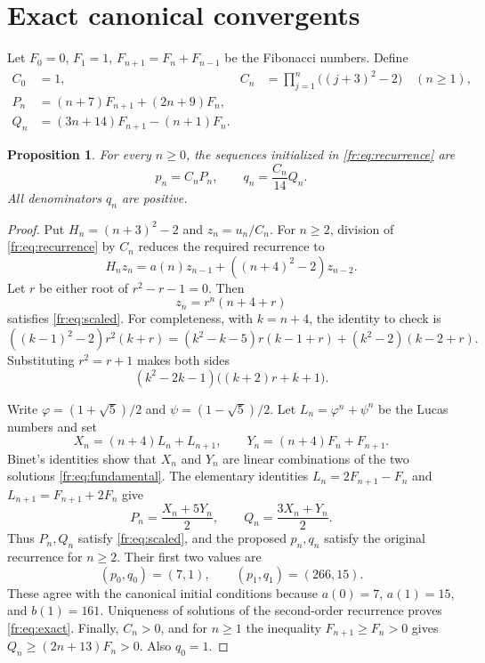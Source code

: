 \documentclass[11pt,a4paper]{article}
\newtheorem{proposition}[theorem]{Proposition}
\theoremstyle{definition}
\theoremstyle{remark}
\numberwithin{equation}{section}
\begin{document}
\section{Exact canonical convergents}

Let $F_0=0$, $F_1=1$, $F_{n+1}=F_n+F_{n-1}$ be the
Fibonacci numbers. Define
\begin{align}
 C_0&=1,&
 C_n&=\prod_{j=1}^{n}\bigl((j+3)^2-2\bigr)\quad(n\ge1),\label{fr:eq:C}\\
 P_n&=(n+7)F_{n+1}+(2n+9)F_n,\label{fr:eq:P}\\
 Q_n&=(3n+14)F_{n+1}-(n+1)F_n.\label{fr:eq:Q}
\end{align}

\begin{proposition}\label{fr:prop:canonical}
For every $n\ge0$, the sequences initialized in
\eqref{fr:eq:recurrence} are
\begin{equation}\label{fr:eq:exact}
       p_n=C_nP_n,\qquad q_n=\frac{C_n}{14}Q_n.
\end{equation}
All denominators $q_n$ are positive.
\end{proposition}

\begin{proof}
Put $H_n=(n+3)^2-2$ and $z_n=u_n/C_n$.
For $n\ge2$, division of \eqref{fr:eq:recurrence} by $C_n$
reduces the required recurrence to
\begin{equation}\label{fr:eq:scaled}
 H_n z_n=a(n)z_{n-1}+((n+4)^2-2)z_{n-2}.
\end{equation}
Let $r$ be either root of $r^2-r-1=0$. Then
\begin{equation}\label{fr:eq:fundamental}
          z_n=r^n(n+4+r)
\end{equation}
satisfies \eqref{fr:eq:scaled}. For completeness, with $k=n+4$,
the identity to check is
\[
 ((k-1)^2-2)r^2(k+r)
 =(k^2-k-5)r(k-1+r)+(k^2-2)(k-2+r).
\]
Substituting $r^2=r+1$ makes both sides
\[
 (k^2-2k-1)\bigl((k+2)r+k+1\bigr).
\]

Write $\varphi=(1+\sqrt5)/2$ and $\psi=(1-\sqrt5)/2$.
Let $L_n=\varphi^n+\psi^n$ be the Lucas numbers and set
\[
 X_n=(n+4)L_n+L_{n+1},\qquad
 Y_n=(n+4)F_n+F_{n+1}.
\]
Binet's identities show that $X_n$ and $Y_n$ are linear
combinations of the two solutions \eqref{fr:eq:fundamental}.
The elementary identities
$L_n=2F_{n+1}-F_n$ and $L_{n+1}=F_{n+1}+2F_n$ give
\[
 P_n=\frac{X_n+5Y_n}{2},\qquad
 Q_n=\frac{3X_n+Y_n}{2}.
\]
Thus $P_n,Q_n$ satisfy \eqref{fr:eq:scaled}, and the proposed
$p_n,q_n$ satisfy the original recurrence for $n\ge2$.
Their first two values are
\[
 (p_0,q_0)=(7,1),\qquad (p_1,q_1)=(266,15).
\]
These agree with the canonical initial conditions because
$a(0)=7$, $a(1)=15$, and $b(1)=161$. Uniqueness of solutions
of the second-order recurrence proves \eqref{fr:eq:exact}.
Finally, $C_n>0$, and for $n\ge1$ the inequality
$F_{n+1}\ge F_n>0$ gives
$Q_n\ge(2n+13)F_n>0$. Also $q_0=1$.
\end{proof}
\end{document}

